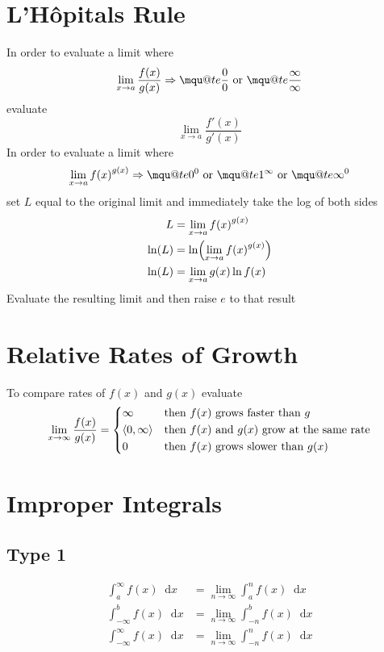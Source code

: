 \documentclass[12pt]{article}
\makeatletter
\DeclarePairedDelimiter\paren{(}{)}
\renewcommand*{\implies}{\Rightarrow}
\newcommand*{\D}[1]{\mathop{}\!\mathrm{d}#1}
\newcommand{\mquote}[1]{{\mathpalette\mqu@te{#1}}}
\newcommand{\mqu@te}[2]{%
  \sbox0{\(\m@th#1\text{``}\)}%
  \sbox1{\(\m@th#1\text{''}\)}%
  \sbox2{\(\m@th#1#2\)}%
  \ifdim\ht2>\ht0
    \raisebox{\dimexpr\ht2-\height}{\box0}%
    #2%
    \raisebox{\dimexpr\ht2-\height}{\box1}%
  \else
    \box0 #2\box1
  \fi
}
\newcommand*{\fixmath}{%
  \makebox{}\vspace{\glueexpr-\baselineskip-\abovedisplayskip}}
\newenvironment{fixbskip}{\setlength{\belowdisplayskip}{0pt}\ignorespaces}%
  {\ignorespacesafterend}
\newenvironment{fixskip}{\setlength{\abovedisplayskip}{0pt}%
  \setlength{\belowdisplayskip}{0pt}\fixmath\ignorespaces}%
  {\ignorespacesafterend}
\makeatother
\begin{document}
\section*{L'H\^{o}pitals Rule}
In order to evaluate a limit where
\[
  \lim_{x \to a} \frac{f(x)}{g(x)} \implies \mquote{\frac{0}{0}} \text{ or }
  \mquote{\frac{\infty}{\infty}}
\]
evaluate
\[
  \lim_{x \to a} \frac{f'(x)}{g'(x)}
\]
In order to evaluate a limit where
\[
  \lim_{x \to a} {f(x)}^{g(x)} \implies \mquote{0^0} \text{ or }
  \mquote{1^\infty} \text{ or } \mquote{\infty^0}
\]
set \(L\) equal to the original limit and immediately take the log of both
sides
\begin{align*}
  L &= \lim_{x \to a} {f(x)}^{g(x)}\\
  \ln(L) &= \ln\paren*{\lim_{x \to a} {f(x)}^{g(x)}}\\
  \ln(L) &= \lim_{x \to a} g(x) \ln f(x)
\end{align*}
Evaluate the resulting limit and then raise \(e\) to that result
\section*{Relative Rates of Growth}
To compare rates of \(f(x)\) and \(g(x)\) evaluate
\begin{fixbskip}
  \[
    \lim_{x \to \infty} \frac{f(x)}{g(x)} = \begin{dcases*}
      \infty & then \(f(x)\) grows faster than \(g\)\\
      \left<0, \infty\right> & then \(f(x)\) and \(g(x)\) grow at the same
        rate\\
      0 & then \(f(x)\) grows slower than \(g(x)\)
    \end{dcases*}
  \]
\end{fixbskip}
\section*{Improper Integrals}
\subsection*{Type 1}
\begin{fixskip}
  \begin{align*}
    \int_a^\infty f(x) \D{x} &= \lim_{n \to \infty} \int_a^n f(x) \D{x}\\
    \int_{-\infty}^b f(x) \D{x} &= \lim_{n \to \infty} \int_{-n}^b f(x) \D{x}\\
    \int_{-\infty}^\infty f(x) \D{x} &= \lim_{n \to \infty} \int_{-n}^n f(x)
      \D{x}
  \end{align*}
\end{fixskip}
\end{document}
